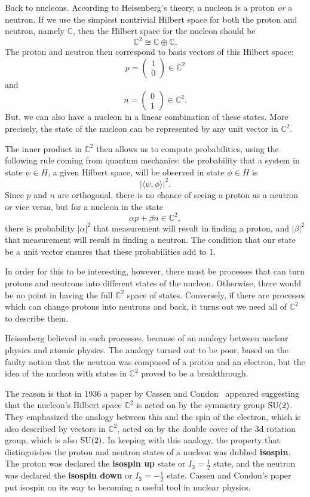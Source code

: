 \documentclass{article}
\newcommand{\C}{{\mathbb C}}  %
\newcommand{\SU}{{\rm SU}}    %
\newcommand{\iso}{\cong} %
\newcommand{\half}{\frac{1}{2}} %
\begin{document}
Back to nucleons. According to Heisenberg's theory, a nucleon is a
proton \textit{or} a neutron.  If we use the simplest nontrivial Hilbert
space for both the proton and neutron, namely $\C$, then the Hilbert
space for the nucleon should be
\[       \C^2 \iso \C \oplus \C.	\]
The proton and neutron then correspond to basis vectors of this Hilbert
space:
\[	p = \left( \begin{array}{c} 1 \\ 0 \end{array} \right) \in \C^2	\]
and
\[	n = \left( \begin{array}{c} 0 \\ 1 \end{array} \right) \in \C^2.	\]
But, we can also have a nucleon in a linear combination of 
these states.  More precisely, the state of the nucleon can be represented 
by any  unit vector in $\C^2$. 

The inner product in $\C^2$ then allows us to compute probabilities, using the
following rule coming from quantum mechanics: the probability that a system in
state $\psi \in H$, a given Hilbert space, will be observed in state $\phi \in
H$ is
\[	\left| \langle \psi , \phi \rangle \right|^2.	\]
Since $p$ and $n$ are orthogonal, there is no chance of seeing a proton as
a neutron or vice versa, but for a nucleon in the state
\[	\alpha p + \beta n \in \C^2,	\]
there is probability $| \alpha |^2$ that
measurement will result in finding a proton, and $|\beta|^2$ that 
measurement will result in finding a neutron.  The condition that our
state be a unit vector ensures that these probabilities add to 1.

In order for this to be interesting, however, there must be
processes that can turn protons and neutrons into different states of
the nucleon. Otherwise, there would be no point in having the full
$\C^2$ space of states.  Conversely, if there are processes which can
change protons into neutrons and back, it turns out we need all of 
$\C^2$ to describe them.

Heisenberg believed in such processes, because of an analogy between
nuclear physics and atomic physics. The analogy turned out to be poor,
based on the faulty notion that the neutron was composed of a proton
and an electron, but the idea of the nucleon with states in $\C^2$
proved to be a breakthrough.

The reason is that in 1936 a paper by Cassen and
Condon~\cite{CassenCondon:nuclearforces} appeared suggesting that the
nucleon's Hilbert space $\C^2$ is acted on by the symmetry group $\SU(2)$. 
They emphasized the analogy between this and the spin of the electron,
which is also described by vectors in $\C^2$, acted on by the double
cover of the 3d rotation group, which is also $\SU(2)$.  In keeping with 
this analogy, the property that distinguishes the proton
and neutron states of a nucleon was dubbed \textbf{isospin}.  The
proton was declared the \textbf{isospin up} state or $I_3 = \half$
state, and the neutron was declared the \textbf{isospin down} or $I_3 =
-\half$ state. Cassen and Condon's paper put isospin on its way to
becoming a useful tool in nuclear physics.
\end{document}
